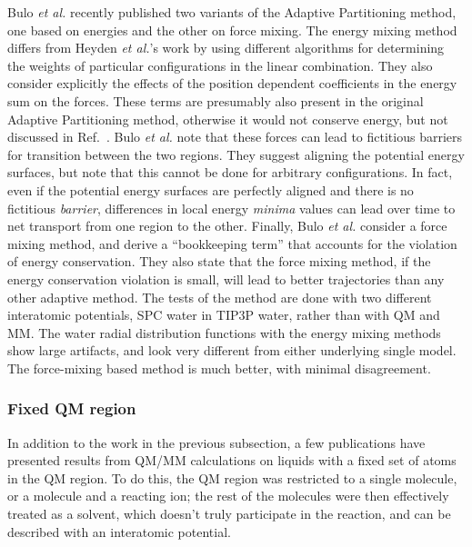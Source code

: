 \documentclass[11pt]{revtex4}
\begin{document}
Bulo {\it et al.} recently published two variants of the Adaptive
Partitioning method\cite{bulo_j_chem_theor_comp_2009a}, one based
on energies and the other on force mixing.  The energy mixing method
differs from Heyden {\it et al.}'s work by using different algorithms
for determining the weights of particular configurations in the
linear combination.  They also consider explicitly the effects of
the position dependent coefficients in the energy sum on the forces.
These terms are presumably also present in the original Adaptive
Partitioning method, otherwise it would not conserve energy, but
not discussed in Ref.~\cite{heyden_j_phys_chem_b_2007a}.   Bulo
{\it et al.} note that these forces can lead to fictitious barriers
for transition between the two regions.  They suggest aligning the
potential energy surfaces, but note that this cannot be done for
arbitrary configurations.  In fact, even if the potential energy
surfaces are perfectly aligned and there is no fictitious {\em
barrier}, differences in local energy {\em minima} values can lead
over time to net transport from one region to the other.  Finally,
Bulo {\it et al.} consider a force mixing method, and derive a
``bookkeeping term'' that accounts for the violation of energy
conservation.  They also state that the force mixing method, if the
energy conservation violation is small, will lead to better
trajectories than any other adaptive method.  The tests of the
method are done with two different interatomic potentials, SPC water
in TIP3P water, rather than with QM and MM.   The water radial
distribution functions with the energy mixing methods show large
artifacts, and look very different from either underlying single
model.  The force-mixing based method is much better, with minimal
disagreement.

\subsubsection{Fixed QM region}

In addition to the work in the previous subsection, a few publications
have presented results from QM/MM calculations on liquids with a
fixed set of atoms in the QM region.  To do this, the QM region was
restricted to a single molecule, or a molecule and a reacting ion;
the rest of the molecules were then effectively treated as a solvent,
which doesn't truly participate in the reaction, and can be described
with an interatomic potential.
\end{document}
